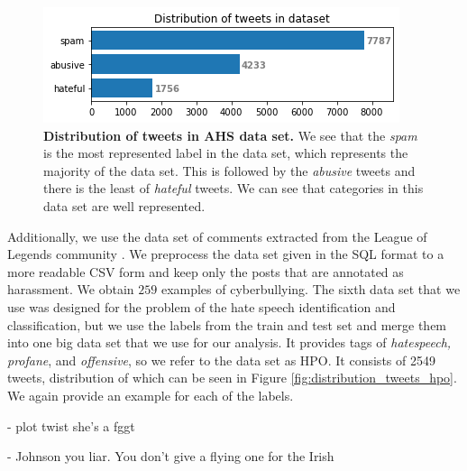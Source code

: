 \documentclass[fleqn,moreauthors,10pt]{ds_report}
\newcommand\bm{0.2pt}
\begin{document}
\begin{figure}[ht]\centering
	\includegraphics[width=\linewidth]{distribution_tweets_dataset2.png}
	\caption{\textbf{Distribution of tweets in AHS data set.} We see that the \textit{spam} is the most represented label in the data set, which represents the majority of the data set. This is followed by the \textit{abusive} tweets and there is the least of \textit{hateful} tweets. We can see that categories in this data set are well represented.}
	\label{fig:distribution_tweets_dataset2}
\end{figure}

\noindent Additionally, we use the data set of comments extracted from the League of Legends community \cite{bretschneider2016detecting}. We preprocess the data set given in the SQL format to a more readable CSV form and keep only the posts that are annotated as harassment. We obtain $259$ examples of cyberbullying. The sixth data set that we use was designed for the problem of the hate speech identification and classification, but we use the labels from the train and test set and merge them into one big data set that we use for our analysis. It provides tags of \textit{hatespeech, profane}, and \textit{offensive}, so we refer to the data set as HPO. It consists of 2549 tweets, distribution of which can be seen in Figure \ref{fig:distribution_tweets_hpo}. We again provide an example for each of the labels.

\begin{tcolorbox}[colback=black!8, width=0.9\linewidth, center,arc=8pt,sharp corners=downhill, boxrule=0.3pt, left=\bm, top=\bm, right=\bm, bottom=\bm, fontupper=\small]
 - plot twist she's a fggt
\end{tcolorbox}

\begin{tcolorbox}[width=0.9\linewidth, center,arc=8pt,sharp corners=downhill, boxrule=0.3pt, left=\bm, top=\bm, right=\bm, bottom=\bm, fontupper=\small]
 - Johnson you liar. You don't give a flying one for the Irish
\end{tcolorbox}
\end{document}
